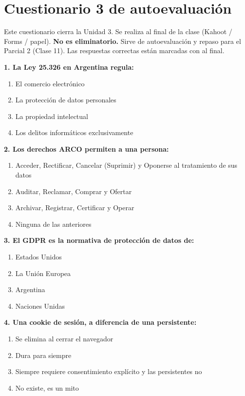 \documentclass[12pt,a4paper]{article}
\newcommand{\checkMark}{\ding{51}}
\begin{document}
\section{Cuestionario 3 de autoevaluaci\'on}

\begin{cajaNota}[title={Instrucciones}]
Este cuestionario cierra la Unidad 3. Se realiza al final de la clase (Kahoot / Forms / papel). \textbf{No es eliminatorio.} Sirve de autoevaluaci\'on y repaso para el Parcial 2 (Clase 11). Las respuestas correctas est\'an marcadas con \checkMark \; al final.
\end{cajaNota}

\vspace{6pt}

\textbf{1. La Ley 25.326 en Argentina regula:}
\begin{enumerate}[label=\alph*), leftmargin=2.5em]
  \item El comercio electr\'onico
  \item La protecci\'on de datos personales
  \item La propiedad intelectual
  \item Los delitos inform\'aticos exclusivamente
\end{enumerate}

\textbf{2. Los derechos ARCO permiten a una persona:}
\begin{enumerate}[label=\alph*), leftmargin=2.5em]
  \item Acceder, Rectificar, Cancelar (Suprimir) y Oponerse al tratamiento de sus datos
  \item Auditar, Reclamar, Comprar y Ofertar
  \item Archivar, Registrar, Certificar y Operar
  \item Ninguna de las anteriores
\end{enumerate}

\textbf{3. El GDPR es la normativa de protecci\'on de datos de:}
\begin{enumerate}[label=\alph*), leftmargin=2.5em]
  \item Estados Unidos
  \item La Uni\'on Europea
  \item Argentina
  \item Naciones Unidas
\end{enumerate}

\textbf{4. Una cookie de sesi\'on, a diferencia de una persistente:}
\begin{enumerate}[label=\alph*), leftmargin=2.5em]
  \item Se elimina al cerrar el navegador
  \item Dura para siempre
  \item Siempre requiere consentimiento expl\'icito y las persistentes no
  \item No existe, es un mito
\end{enumerate}
\end{document}
